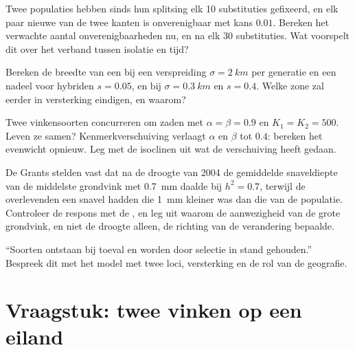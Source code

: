 \begin{exercise}[$\star\star$]\label{exo:b2:speciation:8}
Twee populaties hebben sinds hun splitsing elk 10 substituties gefixeerd,
en elk paar nieuwe  van de twee kanten is onverenigbaar
met kans $0.01$. Bereken het verwachte aantal
onverenigbaarheden nu, en na elk 30 substituties. Wat voorspelt dit over
het verband tussen isolatie en tijd?
\end{exercise}

\begin{exercise}[$\star\star$]\label{exo:b2:speciation:9}
Bereken de breedte van een  bij een verspreiding $\sigma =
\qty{2}{km}$ per generatie en een nadeel voor hybriden $s = 0.05$, en
bij $\sigma = \qty{0.3}{km}$ en $s = 0.4$. Welke zone zal eerder in
versterking eindigen, en waarom?
\end{exercise}

\begin{exercise}[$\star\star\star$]\label{exo:b2:speciation:10}
Twee vinkensoorten concurreren om zaden met $\alpha = \beta = 0.9$ en
$K_1 = K_2 = 500$. Leven ze samen? Kenmerkverschuiving verlaagt
$\alpha$ en $\beta$ tot $0.4$: bereken het evenwicht opnieuw. Leg met
de isoclinen uit wat de verschuiving heeft gedaan.
\end{exercise}

\begin{exercise}[$\star\star\star$]\label{exo:b2:speciation:11}
De Grants stelden vast dat na de droogte van 2004 de gemiddelde snaveldiepte
van de middelste grondvink met \qty{0.7}{mm} daalde bij $h^{2} = 0.7$,
terwijl de overlevenden een snavel hadden die \qty{1}{mm} kleiner was dan die
van de populatie. Controleer de respons met de , en
leg uit waarom de aanwezigheid van de grote grondvink, en niet de droogte
alleen, de richting van de verandering bepaalde.
\end{exercise}

\begin{exercise}[$\star\star\star$]\label{exo:b2:speciation:12}
``Soorten ontstaan bij toeval en worden door selectie in stand gehouden.''
Bespreek dit met het model met twee loci, versterking en de rol van de geografie.
\end{exercise}

\section{Vraagstuk: twee vinken op een eiland}

